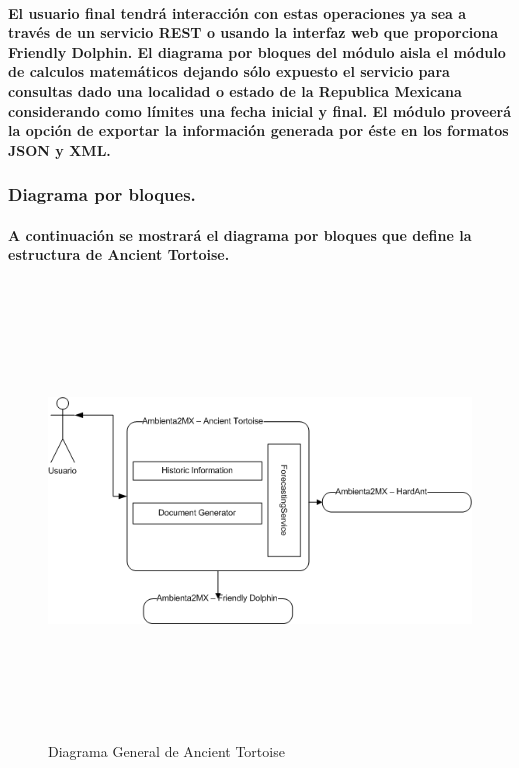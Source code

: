       \paragraph{El usuario final tendrá interacción con estas operaciones ya sea a través de un servicio REST o usando la interfaz web que proporciona Friendly Dolphin. El diagrama por bloques del módulo aisla el módulo de calculos matemáticos dejando sólo expuesto el servicio para consultas dado una localidad o estado de la Republica Mexicana considerando como límites una fecha inicial y final. El módulo proveerá la opción de exportar la información generada por éste en los formatos JSON y XML.}
      \newpage
      \begin{landscape}
      \subsubsection{Diagrama por bloques.}
        \paragraph{A continuación se mostrará el diagrama por bloques que define la estructura de Ancient Tortoise.}
        \begin{figure}[b!]
        \centering
        \includegraphics[width=22.5cm,height=12cm]{./images/DiagramaAncientTortoise.png}
        \caption{Diagrama General de Ancient Tortoise}
      \end{figure}
      \end{landscape}
      \newpage
